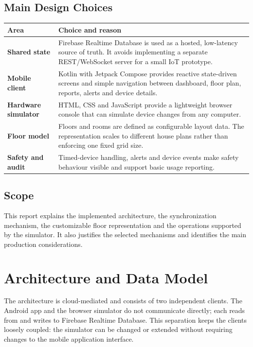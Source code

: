 \documentclass[11pt,a4paper]{article}
\begin{document}
\subsection{Main Design Choices}
\begin{tabularx}{\textwidth}{>{\bfseries}p{3.3cm}X}
\toprule
Area & Choice and reason \\
\midrule
Shared state & Firebase Realtime Database is used as a hosted, low-latency source of truth. It avoids implementing a separate REST/WebSocket server for a small IoT prototype. \\
Mobile client & Kotlin with Jetpack Compose provides reactive state-driven screens and simple navigation between dashboard, floor plan, reports, alerts and device details. \\
Hardware simulator & HTML, CSS and JavaScript provide a lightweight browser console that can simulate device changes from any computer. \\
Floor model & Floors and rooms are defined as configurable layout data. The representation scales to different house plans rather than enforcing one fixed grid size. \\
Safety and audit & Timed-device handling, alerts and device events make safety behaviour visible and support basic usage reporting. \\
\bottomrule
\end{tabularx}

\subsection{Scope}
This report explains the implemented architecture, the synchronization mechanism, the customizable floor representation and the operations supported by the simulator. It also justifies the selected mechanisms and identifies the main production considerations.

\newpage
\section{Architecture and Data Model}
The architecture is cloud-mediated and consists of two independent clients. The Android app and the browser simulator do not communicate directly; each reads from and writes to Firebase Realtime Database. This separation keeps the clients loosely coupled: the simulator can be changed or extended without requiring changes to the mobile application interface.
\end{document}
